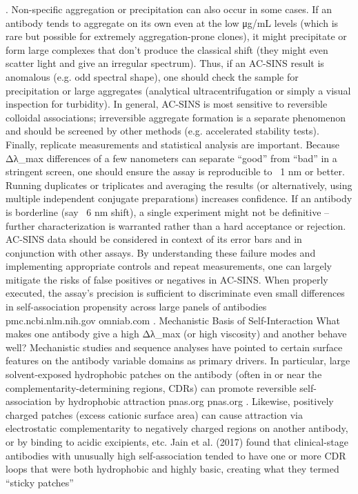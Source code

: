 . Non-specific aggregation or precipitation can also occur in some cases. If an antibody tends to aggregate on its own even at the low μg/mL levels (which is rare but possible for extremely aggregation-prone clones), it might precipitate or form large complexes that don’t produce the classical shift (they might even scatter light and give an irregular spectrum). Thus, if an AC-SINS result is anomalous (e.g. odd spectral shape), one should check the sample for precipitation or large aggregates (analytical ultracentrifugation or simply a visual inspection for turbidity). In general, AC-SINS is most sensitive to reversible colloidal associations; irreversible aggregate formation is a separate phenomenon and should be screened by other methods (e.g. accelerated stability tests). Finally, replicate measurements and statistical analysis are important. Because Δλ_max differences of a few nanometers can separate “good” from “bad” in a stringent screen, one should ensure the assay is reproducible to ~1 nm or better. Running duplicates or triplicates and averaging the results (or alternatively, using multiple independent conjugate preparations) increases confidence. If an antibody is borderline (say ~6 nm shift), a single experiment might not be definitive – further characterization is warranted rather than a hard acceptance or rejection. AC-SINS data should be considered in context of its error bars and in conjunction with other assays. By understanding these failure modes and implementing appropriate controls and repeat measurements, one can largely mitigate the risks of false positives or negatives in AC-SINS. When properly executed, the assay’s precision is sufficient to discriminate even small differences in self-association propensity across large panels of antibodies
pmc.ncbi.nlm.nih.gov
omniab.com
.
Mechanistic Basis of Self-Interaction
What makes one antibody give a high Δλ_max (or high viscosity) and another behave well? Mechanistic studies and sequence analyses have pointed to certain surface features on the antibody variable domains as primary drivers. In particular, large solvent-exposed hydrophobic patches on the antibody (often in or near the complementarity-determining regions, CDRs) can promote reversible self-association by hydrophobic attraction
pnas.org
pnas.org
. Likewise, positively charged patches (excess cationic surface area) can cause attraction via electrostatic complementarity to negatively charged regions on another antibody, or by binding to acidic excipients, etc. Jain et al. (2017) found that clinical-stage antibodies with unusually high self-association tended to have one or more CDR loops that were both hydrophobic and highly basic, creating what they termed “sticky patches”
